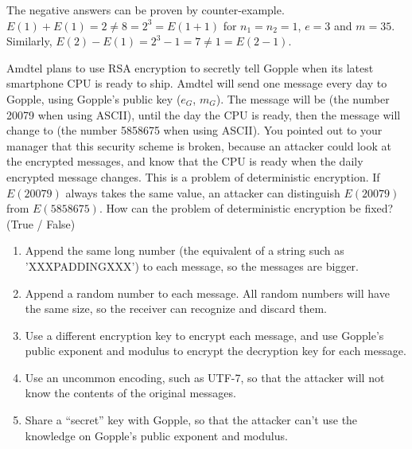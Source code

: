 \documentclass[12pt,twoside]{article}
\begin{document}
\begin{problems}
\begin {problemparts}
{  The negative answers can be proven by counter-example. $E(1) + E(1) = 2 \neq
  8 = 2^3 = E(1 + 1)$ for $n_1 = n_2 = 1$, $e = 3$ and $m = 35$. Similarly,
  $E(2) - E(1) = 2^3 - 1 = 7 \neq 1 = E(2 - 1)$.
}

\problempart {} Amdtel plans to use RSA encryption to secretly tell
Gopple when its latest smartphone CPU is ready to ship. Amdtel will send one
message every day to Gopple, using Gopple's public key ($e_G$, $m_G$). The
message will be  (the number 20079 when using ASCII), until the day
the CPU is ready, then the message will change to  (the number
5858675 when using ASCII). You pointed out to your manager that this security
scheme is broken, because an attacker could look at the encrypted messages, and
know that the CPU is ready when the daily encrypted message changes. This is a
problem of deterministic encryption. If $E(20079)$ always takes the same value,
an attacker can distinguish $E(20079)$ from $E(5858675)$. How can the problem of
deterministic encryption be fixed? (True / False)

\begin{enumerate}
  \item Append the same long number (the equivalent of a string such as
  'XXXPADDINGXXX') to each message, so the messages are bigger.
  \item Append a random number to each message. All random numbers will have the
  same size, so the receiver can recognize and discard them.
  \item Use a different encryption key to encrypt each message, and use Gopple's
  public exponent and modulus to encrypt the decryption key for each message.
  \item Use an uncommon encoding, such as UTF-7, so that the attacker will not
  know the contents of the original messages.
  \item Share a ``secret'' key with Gopple, so that the attacker can't use the
  knowledge on Gopple's public exponent and modulus.
\end{enumerate}
\end{problemparts}

\newpage


\end{problems}
\end{document}
